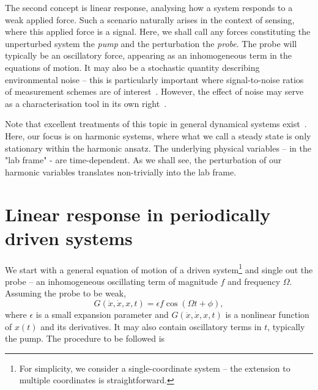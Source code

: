 The second concept is linear response, analysing how a system responds to a weak applied force. Such a scenario naturally arises in the context of sensing, where this applied force is a signal. Here, we shall call any forces constituting the unperturbed system the \textit{pump} and the perturbation the \textit{probe}. The probe will typically be an oscillatory force, appearing as an inhomogeneous term in the equations of motion. It may also be a stochastic quantity describing environmental noise -- this is particularly important where signal-to-noise ratios of measurement schemes are of interest~\cite{Heugel_2019, Cleland_2005}. However, the effect of noise may serve as a characterisation tool in its own right~\cite{Yang_2021b, Huber_2020}.

Note that excellent treatments of this topic in general dynamical systems exist~\cite{Jordan_Smith, Guckenheimer_Holmes, Rand_2005}. Here, our focus is on harmonic systems, where what we call a steady state is only stationary within the harmonic ansatz. The underlying physical variables -- in the "lab frame" - are time-dependent. As we shall see, the perturbation of our harmonic variables translates non-trivially into the lab frame.  

\section{Linear response in periodically driven systems} \label{sec:linresp}

We start with a general equation of motion of a driven system\footnote{For simplicity, we consider a single-coordinate system -- the extension to multiple coordinates is straightforward.} and single out the probe -- an inhomogeneous oscillating term of magnitude $f$ and frequency $\Omega$. Assuming the probe to be weak,
\begin{equation} \label{eq:linresp_origeom}
G(\ddot{x}, \dot{x}, x, t ) = \epsilon f\cos(\Omega  t + \phi ),
\end{equation}
where $\epsilon$ is a small expansion parameter and $G(\ddot{x}, \dot{x}, x, t )$ is a nonlinear function of $x(t)$ and its derivatives. It may also contain oscillatory terms in $t$, typically the pump. The procedure to be followed is

